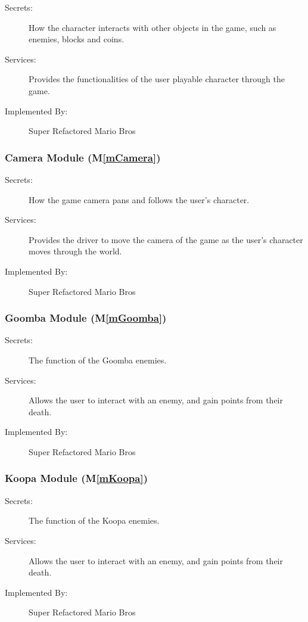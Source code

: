 \documentclass[12pt, titlepage]{article}
\newcommand{\mref}[1]{M\ref{#1}}
\begin{document}
\begin{description}
\item[Secrets:] How the character interacts with other objects in the game, such as enemies, blocks and coins.
\item[Services:] Provides the functionalities of the user playable character through the game.
\item[Implemented By:] Super Refactored Mario Bros
\end{description}

\subsubsection{Camera Module (\mref{mCamera})}

\begin{description}
\item[Secrets:] How the game camera pans and follows the user's character.
\item[Services:] Provides the driver to move the camera of the game as the user's character moves through the world.
\item[Implemented By:] Super Refactored Mario Bros
\end{description}

\subsubsection{Goomba Module (\mref{mGoomba})}

\begin{description}
\item[Secrets:] The function of the Goomba enemies.
\item[Services:] Allows the user to interact with an enemy, and gain points from their death.
\item[Implemented By:] Super Refactored Mario Bros
\end{description}

\subsubsection{Koopa Module (\mref{mKoopa})}

\begin{description}
\item[Secrets:] The function of the Koopa enemies.
\item[Services:] Allows the user to interact with an enemy, and gain points from their death.
\item[Implemented By:] Super Refactored Mario Bros
\end{description}
\end{document}
